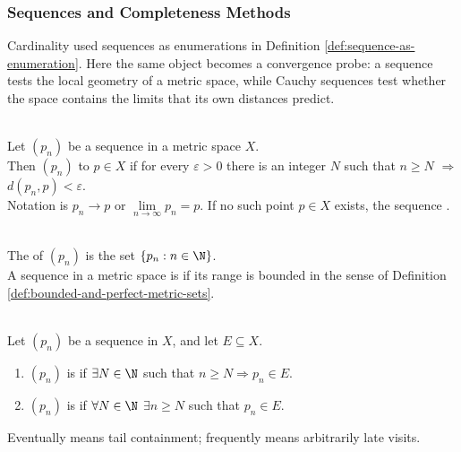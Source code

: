 \subsubsection{Sequences and Completeness Methods}


Cardinality used sequences as enumerations in Definition \ref{def:sequence-as-enumeration}. Here the same object becomes a convergence probe: a sequence tests the local geometry of a metric space, while Cauchy sequences test whether the space contains the limits that its own distances predict.

\begin{definition} \label{def:sequence-convergence-metric}\label{def:sequences-core-definitions-source-todo} \\
Let $(p_n)$ be a sequence in a metric space $X$.\\
Then $(p_n)$  to $p\in X$ if for every $\varepsilon>0$ there is an integer $N$ such that $n\geq N$ $\Longrightarrow$ $d(p_n,p)<\varepsilon$.\\
Notation is $p_n\to p$ or $\lim\limits_{n\to\infty}p_n=p$. If no such point $p\in X$ exists, the sequence .
\end{definition}

\begin{definition} \label{def:sequence-range-and-boundedness} \\
The  of $(p_n)$ is the set $\{p_n:n\in\N\}$.\\
A sequence in a metric space is  if its range is bounded in the sense of Definition \ref{def:bounded-and-perfect-metric-sets}.
\end{definition}

\begin{definition} \label{def:eventually-and-frequently-in-a-set} \\
Let $(p_n)$ be a sequence in $X$, and let $E\subseteq X$.
\begin{enumerate}[label=(\roman*)]
\setlength{\itemsep}{0pt}
\item $(p_n)$ is  if $\exists N\in\N$ such that $n\geq N\Longrightarrow p_n\in E$.
\item $(p_n)$ is  if $\forall N\in\N$ $\exists n\geq N$ such that $p_n\in E$.
\end{enumerate}
Eventually means tail containment; frequently means arbitrarily late visits.
\end{definition}

